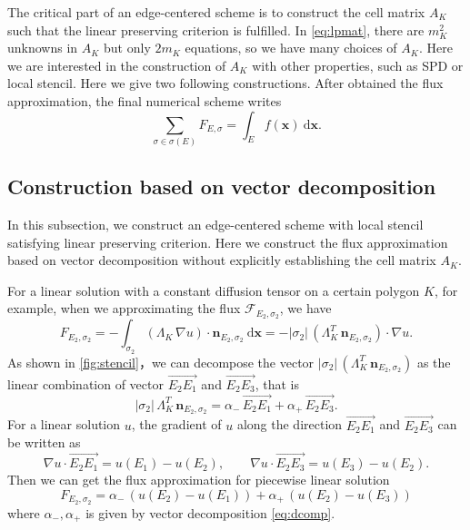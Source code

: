 \documentclass[times,review,preprint]{elsarticle}
\newcommand{\bx}{\bm{x}}
\newcommand{\bn}{\bm{n}}
\begin{document}
The critical part of an edge-centered scheme is to construct the cell matrix $A_K$ such that the linear preserving criterion is fulfilled. In \cref{eq:lpmat}, there are $m_K^2$ unknowns in $A_K$ but only $2 m_K$ equations, so we have many choices of $A_K$. Here we are interested in the construction of $A_K$ with other properties, such as SPD or local stencil. Here we give two following constructions. After obtained the flux approximation, the final numerical scheme writes
\begin{equation}\label{eq:final}
\sum_{\sigma \in \sigma(E)} F_{E, \sigma} = \int_{E} f(\bx) \ \mathrm{d} \bx.
\end{equation}

\subsection{Construction based on vector decomposition}

In this subsection, we construct an edge-centered scheme with local stencil satisfying linear preserving criterion. Here we construct the flux approximation based on vector decomposition without explicitly establishing the cell matrix $A_K$. 

For a linear solution with a constant diffusion tensor on a certain polygon $K$, for example, when we approximating the flux $\mathcal{F}_{E_{2}, \sigma_{2}}$, we have
\begin{equation}\label{numflux}
F_{E_{2}, \sigma_{2}} = - \int_{\sigma_{2}} (\Lambda_K \, \nabla u) \cdot \bn_{E_{2}, \sigma_{2}} \ \mathrm{d} \bx = - |\sigma_{2}| \, (\Lambda_K^T \, \bn_{E_{2}, \sigma_{2}}) \cdot \nabla u.
\end{equation}
As shown in \cref{fig:stencil}，we can decompose the vector $|\sigma_{2}| \, (\Lambda_K^T \, \bn_{E_{2}, \sigma_{2}})$ as the linear combination of vector $\overrightarrow{E_{2} E_{1}}$ and $\overrightarrow{E_{2} E_{3}}$, that is
\begin{equation}\label{eq:dcomp}
|\sigma_{2}| \, \Lambda_K^T \, \bn_{E_{2}, \sigma_{2}} = \alpha_{-} \, \overrightarrow{E_{2} E_{1}} + \alpha_{+} \, \overrightarrow{E_{2} E_{3}}.
\end{equation}
For a linear solution $u$, the gradient of $u$ along the direction  $\overrightarrow{E_{2} E_{1}}$ and $\overrightarrow{E_{2} E_{3}}$ can be written as
\begin{equation*}
\nabla u \cdot \overrightarrow{E_{2} E_{1}} = u(E_{1}) - u(E_{2}), \qquad \nabla u \cdot \overrightarrow{E_{2} E_{3}} = u(E_{3}) - u(E_{2}).
\end{equation*}
Then we can get the flux approximation for piecewise linear solution
\begin{equation*}
F_{E_{2}, \sigma_{2}} = \alpha_{-} \, (u(E_{2}) - u(E_{1})) + \alpha_{+} \, (u(E_{2}) - u(E_{3}))
\end{equation*}
where $\alpha_{-}, \alpha_{+}$ is given by vector decomposition \cref{eq:dcomp}.
\end{document}
